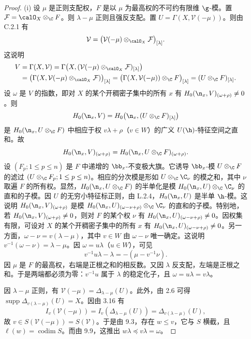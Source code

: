 \begin{proof}
(i) 设 $\mu$ 是正则支配权，$F$ 是以 $\mu$ 为最高权的不可约有限维 $\g$-模。置 $\mathcal{F}=\calO_X\otimes_\C F$。则 $\lambda-\mu$ 正则且强反支配。置 $U=\Gamma(X,\mathcal{V}(-\mu))$。则由 C.2.1 有
$$\mathcal{V}=\bigl(\mathcal{V}(-\mu)\otimes_{\calO_X}\mathcal{F}\bigr)_{[\lambda]}.$$
这说明
{\small
\begin{align*}
V&=\Gamma(X,\mathcal{V})=\Gamma\bigl(X,(\mathcal{V}(-\mu)\otimes_{\calO_X}\mathcal{F})_{[\lambda]}\bigr)\\
&=\bigl(\Gamma(X,\mathcal{V}(-\mu)\otimes_{\calO_X}\mathcal{F})\bigr)_{[\lambda]}
=\bigl(\Gamma(X,\mathcal{V}(-\mu))\otimes_\C F\bigr)_{[\lambda]}=(U\otimes_\C F)_{[\lambda]}.
\end{align*}}
设 $\omega$ 是 $V$ 的指数，即对 $X$ 的某个开稠密子集中的所有 $x$ 有 $H_0(\n_x,V)_{(\omega+\rho)}\ne 0$。则
$$H_0(\n_x,V)=H_0\bigl(\n_x,(U\otimes_\C F)_{[\lambda]}\bigr)$$
是 $H_0(\n_x,U\otimes_\C F)$ 中相应于权 $v\lambda+\rho$（$v\in W$）的广义 $U(\h)$-特征空间之直和。故
$$H_0(\n_x,V)_{(\omega+\rho)}=H_0(\n_x,U\otimes_\C F)_{(\omega+\rho)}.$$
设 $(F_p;1\le p\le n)$ 是 $F$ 中递增的 $\bb_x$-不变极大旗。它诱导 $\bb_x$-模 $U\otimes_\C F$ 的滤过 $(U\otimes_\C F_p;1\le p\le n)$。相应的分次模是形如 $U\otimes_\C\C_\nu$ 的模之和，其中 $\nu$ 取遍 $F$ 的所有权。显然，$H_0(\n_x,U\otimes_\C F)$ 的半单化是模 $H_0(\n_x,U)\otimes_\C\C_\nu$ 的直和的子模。因 $U$ 的无穷小特征标正则，由 L.2.4，$H_0(\n_x,U)$ 是半单 $\h$-模。这说明 $H_0(\n_x,V)_{(\omega+\rho)}$ 是模 $H_0(\n_x,U)_{(\omega-\nu+\rho)}\otimes_\C\C_\nu$ 的直和的子模。特别地，若 $H_0(\n_x,V)_{(\omega+\rho)}\ne 0$，则对 $F$ 的某个权 $\nu$ 有 $H_0(\n_x,U)_{(\omega-\nu+\rho)}\ne 0$。因权集有限，可设对 $X$ 的某个开稠密子集中的所有 $x$ 有 $H_0(\n_x,U)_{(\omega-\nu+\rho)}\ne 0$。另一方面，$\omega-\nu=v(\lambda-\mu)$，其中 $v\in W$ 由 $\omega-\nu$ 唯一确定。这说明 $v^{-1}(\omega-\nu)=\lambda-\mu$。因 $\omega=u\lambda$（$u\in W$），可见
$$v^{-1}u\lambda-\lambda=-(\mu-v^{-1}\nu).$$
因 $\mu$ 是 $F$ 的最高权，右端是正根之和的相反数。又因 $\lambda$ 反支配，左端是正根之和。于是两端都必须为零：$v^{-1}u$ 属于 $\lambda$ 的稳定化子，且 $\omega=u\lambda=v\lambda$。

因 $\lambda-\mu$ 正则，有 $\mathcal{V}(-\mu)=\Delta_{\lambda-\mu}(U)$。此外，由 2.6 可得 $\operatorname{supp}\Delta_{v(\lambda-\mu)}(U)=X$。因由 3.16 有
$$I_v(\mathcal{V}(-\mu))=I_v(\Delta_{\lambda-\mu}(U))=\Delta_{v(\lambda-\mu)}(U),$$
故 $v\in S(\mathcal{V}(-\mu))=S(\mathcal{V})$。于是由 9.3，存在 $w\le v$，它与 $S$ 横截，且 $\ell(w)=\operatorname{codim}S$。而由 9.9，这推出 $w\lambda\preccurlyeq v\lambda=\omega$。


\end{proof}
